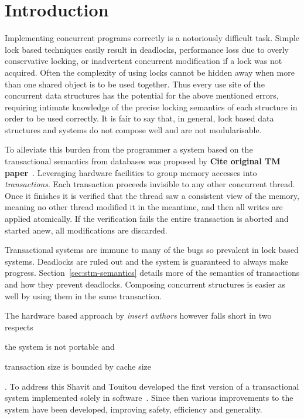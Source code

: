 \section{Introduction}

\label{sec:introduction}


Implementing concurrent programs correctly is a notoriously difficult task.
Simple lock based techniques easily result in deadlocks, performance loss due to
overly conservative locking, or inadvertent concurrent modification if a lock
was not acquired. Often the complexity of using locks cannot be hidden away when
more than one shared object is to be used together. Thus every use site of the
concurrent data structures has the potential for the above mentioned errors,
requiring intimate knowledge of the precise locking semantics of each structure
in order to be used correctly. It is fair to say that, in general, lock based
data structures and systems do not compose well and are not modularisable.

To alleviate this burden from the programmer a system based on the transactional
semantics from databases was proposed by \textbf{Cite original TM
  paper}~\cite{tm}.
Leveraging hardware facilities to group memory accesses into
\emph{transactions}. Each transaction proceeds invisible to any other concurrent
thread. Once it finishes it is verified that the thread saw a consistent view of
the memory, meaning no other thread modified it in the meantime, and then all
writes are applied atomically. If the verification fails the entire transaction
is aborted and started anew, all modifications are discarded.

Transactional systems are immune to many of the bugs so prevalent in lock based
systems. Deadlocks are ruled out and the system is guaranteed to always make
progress. Section~\ref{sec:stm-semantics} details more of the semantics of
transactions and how they prevent deadlocks. Composing concurrent structures is
easier as well by using them in the same transaction.

The hardware based approach by \emph{insert authors} however falls short in two
respects \begin{enumerate*}\item the system is not portable and \item
  transaction size is bounded by cache size
\end{enumerate*}. To address this Shavit and Touitou developed the
first version of a transactional system implemented solely in
software~\cite{stm}. Since then various improvements to the system have been
developed, improving safety, efficiency and generality.
